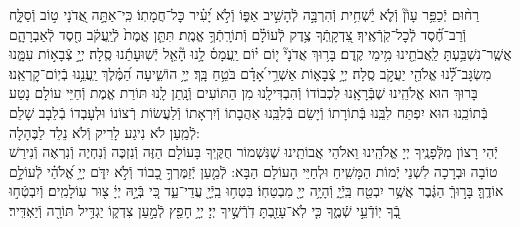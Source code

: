\documentclass[twoside, openany, parskip=half, 11pt]{book}
\begin{document}
%
רַח֨וּם יְֿכַפֵּ֥ר עָוֹן֘ וְֿלֹ֢א יַ֫שְׁחִ֥ית וְֿהִרְבָּ֣ה לְֿהָשִׁ֣יב אַפּ֑וֹ וְֿלֹ֣א יָ֝עִ֗יר כׇּל־חֲמָתֽוֹ׃ כִּֽי־אַתָּ֣ה
%
אֲ֭דֹנָי ט֣וֹב וְֿסַלָּ֑ח וְֿרַב־חֶ֝֗סֶד לְֿכׇל־קֹֽרְֿאֶֽיךָ׃ צִ֭דְקָֽתְֿךָ
%
צֶ֥דֶק לְֿעוֹלָ֗ם וְֿתוֹרָֽתְֿךָ֥ אֱמֶֽת׃ תִּתֵּ֤ן
%
אֱמֶת֙ לְֿיַֽעֲקֹ֔ב חֶ֖סֶד לְֿאַבְרָהָ֑ם אֲשֶֽׁר־נִשְׁבַּ֥עְתָּ לַֽאֲבֹתֵ֖ינוּ מִ֥ימֵי קֶֽדֶם׃ בָּר֥וּךְ
%
אֲדֹנָי֘ י֤וֹם י֗וֹם יַֽעֲמָס֫ לָ֥נוּ הָ֘אֵ֤ל יְֿשֽׁוּעָתֵ֬נוּ סֶֽלָה׃ יְיָ֣
%
צְֿבָא֣וֹת עִמָּ֑נוּ מִשְׂגָּב־לָ֝֗נוּ אֱלֹהֵ֖י יַעֲקֹ֣ב סֶֽלָה׃ יְיָ֥
%
צְֿבָא֑וֹת אַשְׁרֵ֥י ֝אָדָ֗ם בֹּטֵ֥חַ בָּֽךְ׃ יְיָ֥
%
הוֹשִׁ֑יעָה הַ֝מֶּ֗לֶךְ יַֽעֲנֵ֥נוּ בְֿיֽוֹם־קׇרְאֵֽנוּ׃ \\
בָּרוּךְ הוּא אֱלֹהֵֽינוּ שֶׁבְּֿרָאָֽנוּ לִכְבוֹדוֹ וְֿהִבְדִּילָֽנוּ מִן הַתּוֹעִים וְֿנָֽתַן לָֽנוּ תּוֹרַת אֱמֶת וְֿחַיֵּי עוֹלָם נָטַע בְּֿתוֹכֵֽנוּ הוּא יִפְתַּח לִבֵּֽנוּ בְּֿתוֹרָתוֹ וְֿיָשֵׂם בְּֿלִבֵּֽנוּ אַהֲבָתוֹ וְֿיִרְאָתוֹ וְֿלַעֲשׂוֹת רְֿצוֹנוֹ וּלְעָבְדוֹ בְֿלֵבָב שָׁלֵם לְֿמַֽעַן לֹא נִיגַע לָרִיק וְֿלֹא נֵלֵד לַבֶּהָלָה:\\
יְֿהִי רָצוֹן מִלְּֿפָנֶֽיךָ יְיָ אֱלֹהֵֽינוּ וֵאלֹהֵי אֲבוֹתֵֽינוּ שֶׁנִּשְׁמוֹר חֻקֶּֽיךָ בָּעוֹלָם הַזֶּה וְֿנִזְכֶּה וְֿנִחְיֶה וְֿנִרְאֶה וְֿנִירַשׁ טוֹבָה וּבְרָכָה לִשְׁנֵי יְֿמוֹת הַמָּשִֽׁיחַ וּלְחַיֵּי הָעוֹלָם הַבָּא: לְֿמַ֤עַן יְֿזַמֶּרְךָ֣ כָ֭בוֹד וְֿלֹ֣א יִדֹּ֑ם יְיָ֥ אֱ֝לֹהַ֗י לְֿעוֹלָ֣ם אוֹדֶֽךָּ׃ בָּר֣וּךְֿ הַגֶּ֔בֶר אֲשֶׁ֥ר יִבְטַ֖ח בַּֽיְֿיָ֑ וְֿהָיָ֥ה יְיָ֖ מִבְטַחֽוֹ׃ בִּטְח֥וּ
%
בַֽיְֿיָ֖ עֲדֵי־עַ֑ד כִּ֚י בְּֿיָ֣הּ יְיָ֔ צ֖וּר עֽוֹלָמִֽים׃  וְֿיִבְטְֿח֣וּ
%
בְֿ֭ךָ יֽוֹדְֿעֵ֣י שְֿׁמֶ֑ךָ כִּ֤י לֹֽא־עָזַ֖בְתָּ דֹֽרְֿשֶׁ֣יךָ יְיָ׃ יְיָ֥
%
חָפֵ֖ץ לְֿמַ֣עַן צִדְק֑וֹ יַגְדִּ֥יל תּוֹרָ֖ה וְֿיַאְדִּֽיר׃


 \\

\label{veyiten lecha}
\end{document}
